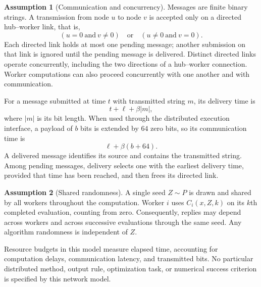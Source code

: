 \documentclass[10pt]{article}
\theoremstyle{definition}
\newtheorem{assumption}{Assumption}
\begin{document}
\begin{assumption}[Communication and concurrency]
Messages are finite binary strings. A transmission from node $u$ to node $v$ is accepted only on a directed hub--worker link, that is,
\[
(u=0\ \text{and}\ v\neq 0)
\quad\text{or}\quad
(u\neq 0\ \text{and}\ v=0).
\]
Each directed link holds at most one pending message; another submission on that link is ignored until the pending message is delivered. Distinct directed links operate concurrently, including the two directions of a hub--worker connection. Worker computations can also proceed concurrently with one another and with communication.

For a message submitted at time $t$ with transmitted string $m$, its delivery time is
\[
t+\ell+\beta |m|,
\]
where $|m|$ is its bit length. When used through the distributed execution interface, a payload of $b$ bits is extended by $64$ zero bits, so its communication time is
\[
\ell+\beta(b+64).
\]
A delivered message identifies its source and contains the transmitted string. Among pending messages, delivery selects one with the earliest delivery time, provided that time has been reached, and then frees its directed link.
\end{assumption}

\begin{assumption}[Shared randomness]
A single seed $Z\sim P$ is drawn and shared by all workers throughout the computation. Worker $i$ uses $C_i(x,Z,k)$ on its $k$th completed evaluation, counting from zero. Consequently, replies may depend across workers and across successive evaluations through the same seed. Any algorithm randomness is independent of $Z$.
\end{assumption}

Resource budgets in this model measure elapsed time, accounting for computation delays, communication latency, and transmitted bits. No particular distributed method, output rule, optimization task, or numerical success criterion is specified by this network model.
\end{document}
